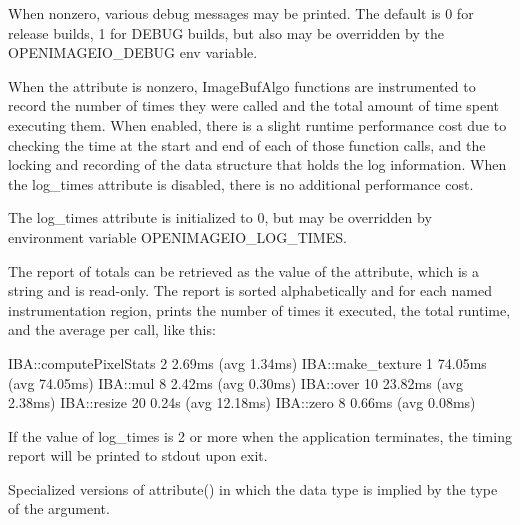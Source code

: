 \vspace{10pt}
When nonzero, various debug messages may be printed. The default is 0 for
release builds, 1 for {\cf DEBUG} builds, but also may be overridden by the
{\cf OPENIMAGEIO\_DEBUG} env variable.
\apiend

\vspace{10pt}
 
\NEW %

When the  attribute is nonzero, {\cf ImageBufAlgo} functions
are instrumented to record the number of times they were called and the
total amount of time spent executing them. When enabled, there is a slight
runtime performance cost due to checking the time at the start and end of
each of those function calls, and the locking and recording of the data
structure that holds the log information. When the {\cf log_times} attribute
is disabled, there is no additional performance cost.

The {\cf log_times} attribute is initialized to 0, but may be overridden by
environment variable {\cf OPENIMAGEIO_LOG_TIMES}.

The report of totals can be retrieved as the value of the
 attribute, which is a string and is read-only. The
report is sorted alphabetically and for each named instrumentation region,
prints the number of times it executed, the total runtime, and the average
per call, like this:
\begin{code}
    IBA::computePixelStats        2   2.69ms  (avg   1.34ms)
    IBA::make_texture             1  74.05ms  (avg  74.05ms)
    IBA::mul                      8   2.42ms  (avg   0.30ms)
    IBA::over                    10  23.82ms  (avg   2.38ms)
    IBA::resize                  20   0.24s   (avg  12.18ms)
    IBA::zero                     8   0.66ms  (avg   0.08ms)
\end{code}

If the value of {\cf log_times} is 2 or more when the application terminates,
the timing report will be printed to {\cf stdout} upon exit.
\apiend

\apiend


Specialized versions of {\cf attribute()} in which the data type is
implied by the type of the argument.
\apiend



